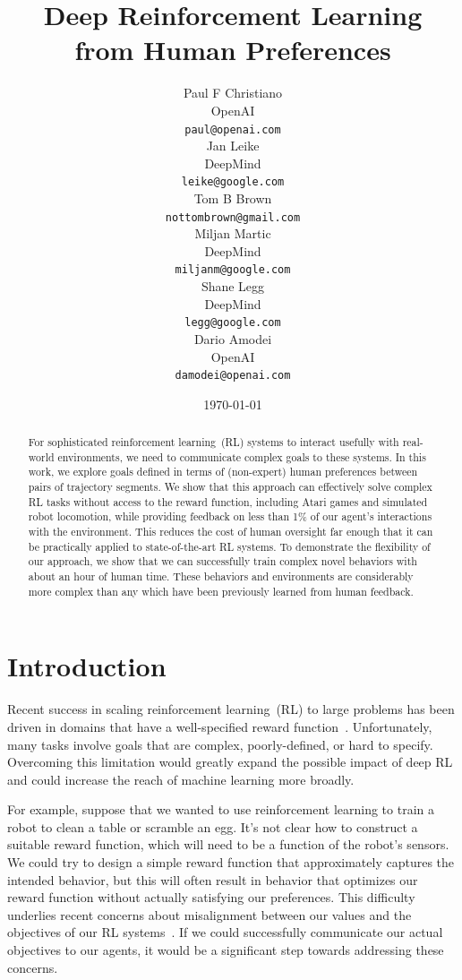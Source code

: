 \documentclass{article}
\title{Deep Reinforcement Learning \\ from Human Preferences}
\author{
  Paul F Christiano \\
  OpenAI \\
  \texttt{paul@openai.com} \\
  \And
  Jan Leike \\
  DeepMind \\
  \texttt{leike@google.com} \\
  \And
  Tom B Brown \\
  \texttt{nottombrown@gmail.com} \\
  \And
  Miljan Martic \\
  DeepMind \\
  \texttt{miljanm@google.com} \\
  \And
  Shane Legg \\
  DeepMind \\
  \texttt{legg@google.com} \\
  \And
  Dario Amodei \\
  OpenAI \\
  \texttt{damodei@openai.com} \\
}
\date{\today}
\begin{document}
\maketitle

\begin{abstract}%
For sophisticated reinforcement learning~(RL) systems to interact usefully with real-world environments,
we need to communicate complex goals to these systems.
In this work, we explore goals defined in terms of (non-expert) human preferences between pairs of trajectory segments.
We show that this approach can effectively solve complex RL tasks without access to the reward function,
including Atari games and simulated robot locomotion,
while providing feedback on less than 1\% of our agent's interactions with the environment.
This reduces the cost of human oversight far enough that it can be practically applied to state-of-the-art RL systems.
To demonstrate the flexibility of our approach,
we show that we can successfully train complex novel behaviors
with about an hour of human time.
These behaviors and environments are considerably more complex
than any which have been previously learned from human feedback.
\end{abstract}



\section{Introduction}
\label{sec:introduction}

Recent success in scaling reinforcement learning~(RL) to large problems
has been driven in domains that have a well-specified reward function~\citep{Mnih15,Mnih16,Silver16}.
Unfortunately, many tasks involve goals that are complex, poorly-defined, or hard to specify.
Overcoming this limitation would greatly expand the possible impact of deep RL
and could increase the reach of machine learning more broadly.

For example, suppose that we wanted to use reinforcement learning
to train a robot to clean a table or scramble an egg.
It's not clear how to construct a suitable reward function,
which will need to be a function of the robot's sensors.
We could try to design a simple reward function that approximately captures the intended behavior,
but this will often result in behavior that optimizes our reward function without actually
satisfying our preferences.
This difficulty underlies recent concerns about misalignment
between our values and the objectives of our RL systems~\citep{Bostrom14,Russell16,Amodei16}.
If we could successfully communicate our actual objectives to our agents,
it would be a significant step towards addressing these concerns.
\end{document}
